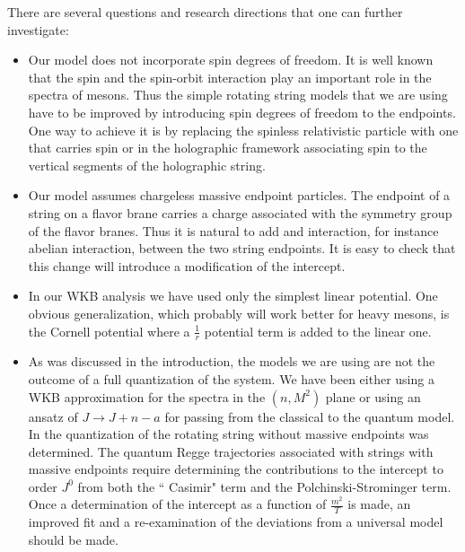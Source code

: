 \documentclass[11pt,a4]{article}
\begin{document}
There are several questions and research directions that one can further investigate:

\begin{itemize}

\item

Our model does not incorporate spin degrees of freedom. It is well known that the spin and the spin-orbit interaction play an important role in the spectra of mesons. Thus the simple rotating string models that we are using have to be improved by introducing spin degrees of freedom to the endpoints. One way to achieve it is by replacing the spinless relativistic particle with one that carries spin or in the holographic framework associating spin to the vertical segments of the holographic string.

\item

Our model assumes chargeless massive endpoint particles. The endpoint of a string on a flavor brane carries a charge associated with the symmetry group of the flavor branes. Thus it is natural to add and interaction, for instance abelian interaction, between the two string endpoints. It is easy to check that this change will introduce a modification of the intercept.

\item

In our WKB analysis we have used only the simplest linear potential. One obvious generalization, which probably will work better for heavy mesons, is the Cornell potential where a $\frac{1}{r}$ potential term is added to the linear one.

\item

As was discussed in the introduction, the models we are using are not the outcome of a full quantization of the system. We have been either using a WKB approximation for the spectra in the $(n,M^2)$ plane or using an ansatz of $J\rightarrow J+n-a$ for passing from the classical to the quantum model. In \cite{Hellerman:2013kba} the quantization of the rotating string without massive endpoints was determined. The quantum Regge trajectories associated with strings with massive endpoints require determining the contributions to the intercept to order $J^0$ from both the `` Casimir" term and the Polchinski-Strominger term\cite{AHSY}. Once a determination of the intercept as a function of $\frac{m^2}{T}$ is made, an improved fit and a re-examination of the deviations from a universal model should be made.


\end{itemize}
\end{document}
